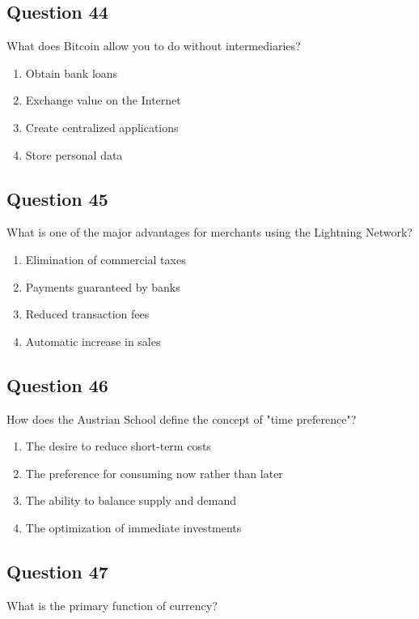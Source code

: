 \documentclass[12pt,a4paper]{article}
\begin{document}
\bigskip


\subsection*{Question 44}
What does Bitcoin allow you to do without intermediaries?

\begin{enumerate}[label=\Alph*., leftmargin=*]
\item Obtain bank loans
\item Exchange value on the Internet
\item Create centralized applications
\item Store personal data
\end{enumerate}

\bigskip


\subsection*{Question 45}
What is one of the major advantages for merchants using the Lightning Network?

\begin{enumerate}[label=\Alph*., leftmargin=*]
\item Elimination of commercial taxes
\item Payments guaranteed by banks
\item Reduced transaction fees
\item Automatic increase in sales
\end{enumerate}

\bigskip


\subsection*{Question 46}
How does the Austrian School define the concept of "time preference"?

\begin{enumerate}[label=\Alph*., leftmargin=*]
\item The desire to reduce short-term costs
\item The preference for consuming now rather than later
\item The ability to balance supply and demand
\item The optimization of immediate investments
\end{enumerate}

\bigskip


\subsection*{Question 47}
What is the primary function of currency?
\end{document}
